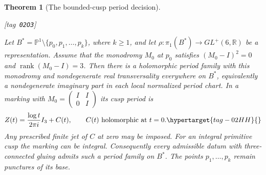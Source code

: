 \documentclass[11pt,a4paper]{article}
\numberwithin{equation}{section}
\newtheorem{theorem}{Theorem}[section]
\theoremstyle{definition}
\newcommand{\StatementRecord}[4]{{\upshape\footnotesize[tag~\texttt{#3}]}\enspace\ignorespaces}
\begin{document}
\begin{theorem}[The bounded-cusp period decision]\hypertarget{tag-02O3}{}\label{maps:src:F.3.11}
\StatementRecord{maps:src:F.3.11}{proved}{02O3}{\cref{maps:src:F.2.1}, \eqref{maps:eq:F.O7}, \cref{maps:src:F.3.8}, \cref{maps:src:F.3.10}, \cref{maps:src:F.2.7}, \cref{maps:src:F.2.15}}


Let
$B^*=\mathbb P^1\setminus\{p_0,p_1,\ldots,p_k\}$,
where $k\ge1$, and let
$\rho:\pi_1(B^*)\to GL^+(6,\mathbb R)$ be a representation.
Assume that the monodromy $M_0$ at $p_0$ satisfies
$(M_0-I)^2=0$ and $\operatorname{rank}(M_0-I)=3$.
Then there is a holomorphic period family with this monodromy
and nondegenerate real transversality everywhere on $B^*$,
equivalently a nondegenerate imaginary part in each local
normalized period chart.
In a marking with $M_0=\left(\begin{smallmatrix}I&I\\0&I\end{smallmatrix}\right)$
its cusp period is
\begin{equation}
 Z(t)=\frac{\log t}{2\pi i}I_3+C(t),
 \qquad C(t)\text{ holomorphic at }t=0.
 \hypertarget{tag-02HH}{}\label{maps:eq:F.O6}
\end{equation}
Any prescribed finite jet of $C$ at zero may be imposed.
For an integral primitive cusp the marking can be integral.
Consequently every admissible datum with three-connected gluing
admits such a period family on $B^*$. The points
$p_1,\ldots,p_k$ remain punctures of its base.

\end{theorem}
\end{document}
